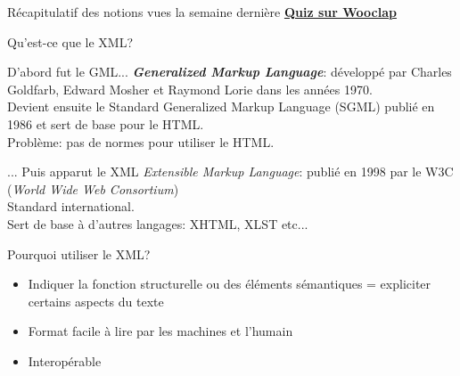 \begin{frame}{Récapitulatif des notions vues la semaine dernière}
\centering
    \textbf{\href{https://app.wooclap.com/events/JKAFURZ/questions/6aad0033ad4668ee6c1228cd}{Quiz sur Wooclap}}
\end{frame}

\begin{frame}{Qu'est-ce que le XML?}
\begin{block}{D'abord fut le GML... }
\vspace{1em}
    \textbf{\textit{Generalized Markup Language}}: développé par Charles Goldfarb, Edward Mosher et Raymond Lorie dans les années 1970.\\
    \textrightarrow{} Devient ensuite le Standard Generalized Markup Language (SGML) publié en 1986 et sert de base pour le HTML.\\
    \textrightarrow{} Problème: pas de normes pour utiliser le HTML.
\end{block}
\vspace{1em}
\begin{block}{... Puis apparut le XML}
\vspace{1em}
\textit{Extensible Markup Language}: publié en 1998 par le W3C (\textit{World Wide Web Consortium})\\ 
\textrightarrow{} Standard international.\\
\textrightarrow{} Sert de base à d'autres langages: XHTML, XLST etc...
\end{block}
    

\end{frame}


\begin{frame}{Pourquoi utiliser le XML?}

    \begin{itemize}
        \item Indiquer la fonction structurelle ou des éléments sémantiques = expliciter certains aspects du texte
        \item Format facile à lire par les machines et l'humain
        \item Interopérable
    \end{itemize}
\end{frame}

